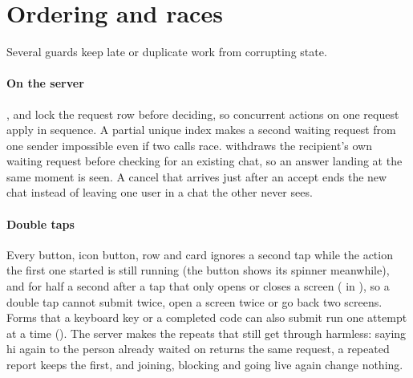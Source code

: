 \section{Ordering and races}
\label{sec:ordering}

Several guards keep late or duplicate work from corrupting state.

\paragraph{On the server} ,  and  lock the request row
before deciding, so concurrent actions on one request apply in sequence. A partial unique index makes a
second waiting request from one sender impossible even if two calls race.  withdraws the
recipient's own waiting request before checking for an existing chat, so an answer landing at the same
moment is seen. A cancel that arrives just after an accept ends the new chat instead of leaving one user
in a chat the other never sees.

\paragraph{Double taps} Every button, icon button, row and card ignores a second tap while the action
the first one started is still running (the button shows its spinner meanwhile), and for half a second
after a tap that only opens or closes a screen ( in
), so a double tap cannot submit twice, open a screen twice or go
back two screens. Forms that a keyboard key or a completed code can also submit run one attempt at a time
(). The server makes the repeats that still get through harmless: saying hi again to
the person already waited on returns the same request, a repeated report keeps the first, and joining,
blocking and going live again change nothing.


